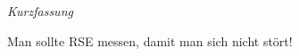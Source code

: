 

\newpage
\thispagestyle{empty}
\begin{center}
\Huge\emph{Kurzfassung}
\end{center}
\medskip
\noindent

Man sollte RSE messen, damit man sich nicht stört!
